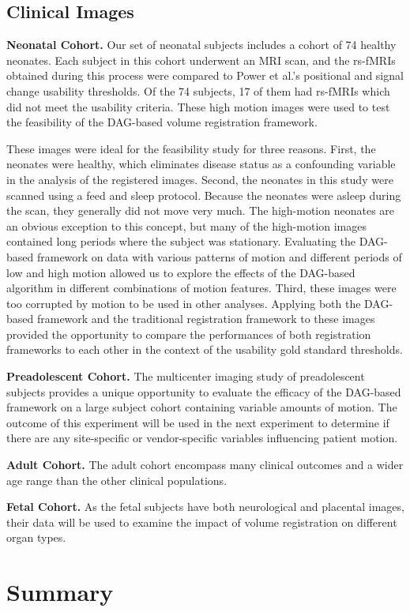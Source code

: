 \subsection{Clinical Images}

\textbf{Neonatal Cohort.} Our set of neonatal subjects includes a cohort of 74 healthy neonates. Each subject in this cohort underwent an MRI scan, and the rs-fMRIs obtained during this process were compared to Power et al.'s positional and signal change usability thresholds. Of the 74 subjects, 17 of them had rs-fMRIs which did not meet the usability criteria. These high motion images were used to test the feasibility of the DAG-based volume registration framework. 

These images were ideal for the feasibility study for three reasons. First, the neonates were healthy, which eliminates disease status as a confounding variable in the analysis of the registered images. Second, the neonates in this study were scanned using a feed and sleep protocol. Because the neonates were asleep during the scan, they generally did not move very much. The high-motion neonates are an obvious exception to this concept, but many of the high-motion images contained long periods where the subject was stationary. Evaluating the DAG-based framework on data with various patterns of motion and different periods of low and high motion allowed us to explore the effects of the DAG-based algorithm in different combinations of motion features. Third, these images were too corrupted by motion to be used in other analyses. Applying both the DAG-based framework and the traditional registration framework to these images provided the opportunity to compare the performances of both registration frameworks to each other in the context of the usability gold standard thresholds. 

\textbf{Preadolescent Cohort.} The multicenter imaging study of preadolescent subjects provides a unique opportunity to evaluate the efficacy of the DAG-based framework on a large subject cohort containing variable amounts of motion. The outcome of this experiment will be used in the next experiment to determine if there are any site-specific or vendor-specific variables influencing patient motion.

\textbf{Adult Cohort.} The adult cohort encompass many clinical outcomes and a wider age range than the other clinical populations. 

\textbf{Fetal Cohort.} As the fetal subjects have both neurological and placental images, their data will be used to examine the impact of volume registration on different organ types.

\section{Summary}
